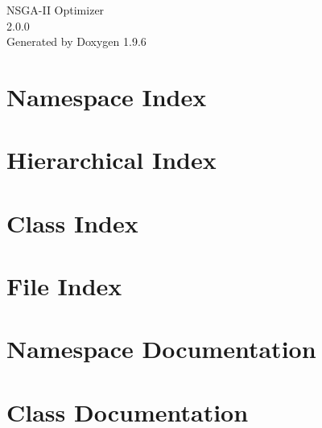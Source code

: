 \documentclass[twoside]{book}
\newcommand{\+}{\discretionary{\mbox{\scriptsize$\hookleftarrow$}}{}{}}
\newcommand{\clearemptydoublepage}{%
    \newpage{\pagestyle{empty}\cleardoublepage}%
  }
\begin{document}
  \raggedbottom
    \hypersetup{pageanchor=false,
                bookmarksnumbered=true,
                pdfencoding=unicode
               }
  \begin{titlepage}
  \vspace*{7cm}
  \begin{center}%
  {\Large NSGA-\/\+II Optimizer}\\
  [1ex]\large 2.\+0.\+0 \\
  \vspace*{1cm}
  {\large Generated by Doxygen 1.9.6}\\
  \end{center}
  \end{titlepage}
  \clearemptydoublepage
  \tableofcontents
  \clearemptydoublepage
  \hypersetup{pageanchor=true}
\chapter{Namespace Index}

\chapter{Hierarchical Index}

\chapter{Class Index}

\chapter{File Index}

\chapter{Namespace Documentation}

\chapter{Class Documentation}














\end{document}
